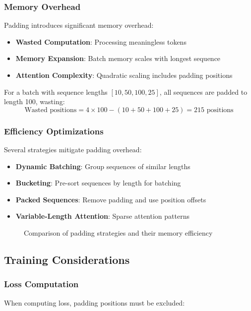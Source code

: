 \subsubsection{Memory Overhead}
Padding introduces significant memory overhead:
\begin{itemize}
\item \textbf{Wasted Computation}: Processing meaningless \pad{} tokens
\item \textbf{Memory Expansion}: Batch memory scales with longest sequence
\item \textbf{Attention Complexity}: Quadratic scaling includes padding positions
\end{itemize}

For a batch with sequence lengths $[10, 50, 100, 25]$, all sequences are padded to length 100, wasting:
$$\text{Wasted positions} = 4 \times 100 - (10 + 50 + 100 + 25) = 215 \text{ positions}$$

\subsubsection{Efficiency Optimizations}
Several strategies mitigate padding overhead:

\begin{itemize}
\item \textbf{Dynamic Batching}: Group sequences of similar lengths
\item \textbf{Bucketing}: Pre-sort sequences by length for batching
\item \textbf{Packed Sequences}: Remove padding and use position offsets
\item \textbf{Variable-Length Attention}: Sparse attention patterns
\end{itemize}

\begin{figure}[h]
\centering
% 
\caption{Comparison of padding strategies and their memory efficiency}
\end{figure}

\subsection{Training Considerations}

\subsubsection{Loss Computation}
When computing loss, padding positions must be excluded:

